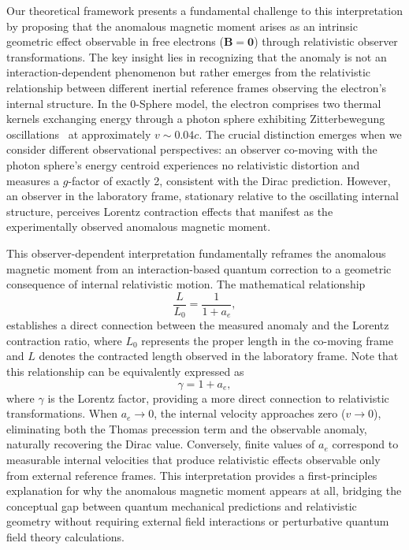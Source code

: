 \documentclass[%
 reprint,
 amsmath,amssymb,
 aps,
]{revtex4-1}
\numberwithin{equation}{section}%
\begin{document}
Our theoretical framework presents a fundamental challenge to this interpretation by proposing that the anomalous magnetic moment arises as an intrinsic geometric effect observable in free electrons ($\mathbf{B} = \mathbf{0}$) through relativistic observer transformations. The key insight lies in recognizing that the anomaly is not an interaction-dependent phenomenon but rather emerges from the relativistic relationship between different inertial reference frames observing the electron's internal structure. In the 0-Sphere model, the electron comprises two thermal kernels exchanging energy through a photon sphere exhibiting Zitterbewegung oscillations~\cite{schrodinger1930} at approximately $v \sim 0.04c$. The crucial distinction emerges when we consider different observational perspectives: an observer co-moving with the photon sphere's energy centroid experiences no relativistic distortion and measures a $g$-factor of exactly 2, consistent with the Dirac prediction. However, an observer in the laboratory frame, stationary relative to the oscillating internal structure, perceives Lorentz contraction effects that manifest as the experimentally observed anomalous magnetic moment.

This observer-dependent interpretation fundamentally reframes the anomalous magnetic moment from an interaction-based quantum correction to a geometric consequence of internal relativistic motion. The mathematical relationship 
\begin{equation}
    \frac{L}{L_0} = \frac{1}{1 + a_e},
    \label{eq:length_contraction}
\end{equation}
establishes a direct connection between the measured anomaly and the Lorentz contraction ratio, where $L_0$ represents the proper length in the co-moving frame and $L$ denotes the contracted length observed in the laboratory frame. Note that this relationship can be equivalently expressed as 
\begin{equation}
\gamma = 1 + a_e,
\label{eq:gamma_anomaly_relation}
\end{equation}
where $\gamma$ is the Lorentz factor, providing a more direct connection to relativistic transformations. When $a_e \to 0$, the internal velocity approaches zero ($v \to 0$), eliminating both the Thomas precession term and the observable anomaly, naturally recovering the Dirac value. Conversely, finite values of $a_e$ correspond to measurable internal velocities that produce relativistic effects observable only from external reference frames. This interpretation provides a first-principles explanation for why the anomalous magnetic moment appears at all, bridging the conceptual gap between quantum mechanical predictions and relativistic geometry without requiring external field interactions or perturbative quantum field theory calculations.
\end{document}

